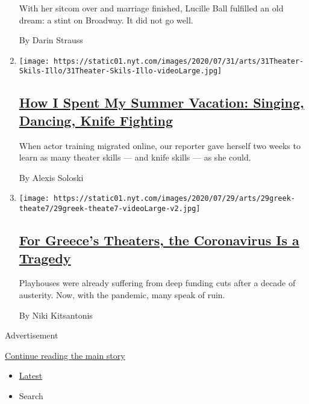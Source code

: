 \begin{enumerate}
  With her sitcom over and marriage finished, Lucille Ball fulfilled an
  old dream: a stint on Broadway. It did not go well.

  By Darin Strauss
\item
  \texttt{[image: https://static01.nyt.com/images/2020/07/31/arts/31Theater-Skils-Illo/31Theater-Skils-Illo-videoLarge.jpg]}

  \hypertarget{how-i-spent-my-summer-vacation-singing-dancing-knife-fighting}{%
  \subsection{\texorpdfstring{\href{/2020/07/30/theater/theater-classes-at-home.html}{How
  I Spent My Summer Vacation: Singing, Dancing, Knife
  Fighting}}{How I Spent My Summer Vacation: Singing, Dancing, Knife Fighting}}\label{how-i-spent-my-summer-vacation-singing-dancing-knife-fighting}}

  When actor training migrated online, our reporter gave herself two
  weeks to learn as many theater skills --- and knife skills --- as she
  could.

  By Alexis Soloski
\item
  \texttt{[image: https://static01.nyt.com/images/2020/07/29/arts/29greek-theate7/29greek-theate7-videoLarge-v2.jpg]}

  \hypertarget{for-greeces-theaters-the-coronavirus-is-a-tragedy}{%
  \subsection{\texorpdfstring{\href{/2020/07/30/theater/greece-theater-austerity-coronavirus.html}{For
  Greece's Theaters, the Coronavirus Is a
  Tragedy}}{For Greece's Theaters, the Coronavirus Is a Tragedy}}\label{for-greeces-theaters-the-coronavirus-is-a-tragedy}}

  Playhouses were already suffering from deep funding cuts after a
  decade of austerity. Now, with the pandemic, many speak of ruin.

  By Niki Kitsantonis
\end{enumerate}

Advertisement

\protect\hyperlink{after-mid1}{Continue reading the main story}

\begin{itemize}
\tightlist
\item
  \protect\hyperlink{stream-panel}{Latest}
\item
  Search
\end{itemize}

